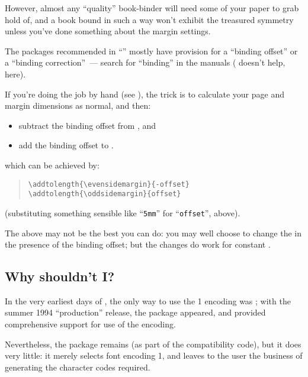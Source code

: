 However, almost any ``quality'' book-binder will need some of your
paper to grab hold of, and a book bound in such a way won't exhibit
the treasured symmetry unless you've done something about the margin
settings.

The packages recommended in %
``'' mostly have provision for
a ``binding offset'' or a ``binding correction''~--- search for
``binding'' in the manuals ( doesn't help, here).

If you're doing the job by hand (see %
), the trick is to
calculate your page and margin dimensions as normal, and then:
\begin{itemize}
\item subtract the binding offset from , and
\item add the binding offset to .
\end{itemize}
which can be achieved by:
\begin{quote}
\begin{verbatim}
\addtolength{\evensidemargin}{-offset}
\addtolength{\oddsidemargin}{offset}
\end{verbatim}
\end{quote}
(substituting something sensible like ``\texttt{5mm}'' for
``\texttt{offset}'', above).

The above may not be the best you can do: you may well choose to
change the  in the presence of the binding offset; but
the changes do work for constant .

\subsection{Why shouldn't I?}


In the very earliest days of \LaTeXe{}, the only way to use the
1 encoding was ; with the summer 1994
``production'' release, the  package appeared, and
provided comprehensive support for use of the encoding.

Nevertheless, the  package remains (as part of the
\LaTeXo{} compatibility code), but it does very little: it merely
selects font encoding 1, and leaves to the user the business
of generating the character codes required.

